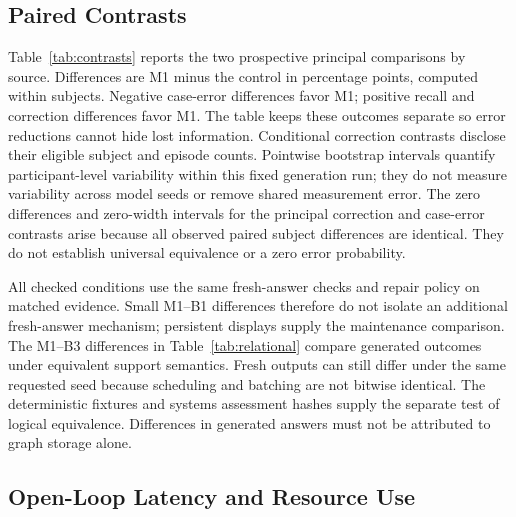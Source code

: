\subsection{Paired Contrasts}

Table~\ref{tab:contrasts} reports the two prospective principal comparisons by
source. Differences are M1 minus the control in percentage points, computed
within subjects. Negative case-error differences favor M1; positive recall and
correction differences favor M1. The table keeps these outcomes separate so
error reductions cannot hide lost information. Conditional correction contrasts
disclose their eligible subject and episode counts. Pointwise bootstrap intervals quantify
participant-level variability within this fixed generation run; they do not
measure variability across model seeds or remove shared measurement error.
The zero differences and zero-width intervals for the principal correction and
case-error contrasts arise because all observed paired subject differences are
identical. They do not establish universal equivalence or a zero error probability.

\begin{table}[t]
\caption{Principal paired differences with 2,000 subject-cluster resamples.
The M1--B1 reliability contrast is interpreted jointly for error and recall.
N (S/E) gives retained subjects/episodes.
Intervals are pointwise 95\%; no hypothesis-test $p$-values are reported.}
\label{tab:contrasts}
\centering\small\setlength{\tabcolsep}{3pt}

\end{table}

All checked conditions use the same fresh-answer checks and repair policy on
matched evidence. Small M1--B1 differences therefore do not isolate an additional
fresh-answer mechanism; persistent displays supply the maintenance comparison.
The M1--B3 differences in Table~\ref{tab:relational} compare generated outcomes
under equivalent support semantics. Fresh outputs can still differ under the
same requested seed because scheduling and batching are not bitwise identical.
The deterministic fixtures and systems assessment hashes supply the separate
test of logical equivalence. Differences in generated answers must not be
attributed to graph storage alone.

\subsection{Open-Loop Latency and Resource Use}

